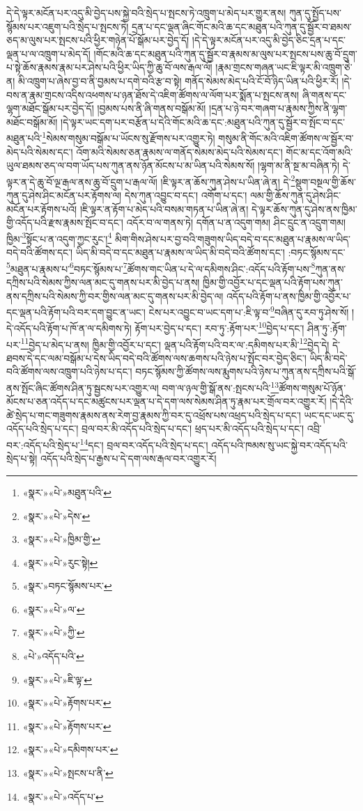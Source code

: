དེ་དེ་ལྟར་མངོན་པར་འདུ་མི་བྱེད་པས་སྐྱེ་བའི་སྲེད་པ་སྤངས་ཏེ་འཁྲུག་པ་མེད་པར་གྱུར་ནས། ཀུན་དུ་སྤྱོད་པས་སྙོམས་པར་འཇུག་པའི་སྲེད་པ་སྤངས་ཏེ། དྲན་པ་དང་ལྡན་ཞིང་གོང་མའི་ཆ་དང་མཐུན་པའི་ཀུན་དུ་སྦྱོར་བ་ཐམས་ཅད་མ་ལུས་པར་སྤངས་པའི་ཕྱིར་གཉེན་པོ་སྒོམ་པར་བྱེད་དོ། །དེ་དེ་ལྟར་མངོན་པར་འདུ་མི་བྱེད་ཅིང་དྲན་པ་དང་ལྡན་པ་ལ་འཁྲུག་པ་མེད་དོ། །གོང་མའི་ཆ་དང་མཐུན་པའི་ཀུན་དུ་སྦྱོར་བ་རྣམས་མ་ལུས་པར་སྤངས་པས་ཆུ་བོ་དྲུག་པ་སྟེ་ཆོས་རྣམས་རྣམ་པར་ཤེས་པའི་ཕྱིར་ཡིད་ཀྱི་ཆུ་བོ་ལས་རྒལ་ལོ། །རྣམ་གྲངས་གཞན་ཡང་ཇི་ལྟར་མི་འཁྲུག་ཅེ་ན། མི་འཁྲུག་པ་ཞེས་བྱ་བ་ནི་བྱམས་པ་དགེ་བའི་རྩ་བ་སྟེ། གནོད་སེམས་མེད་པའི་ངོ་བོ་ཉིད་ཡིན་པའི་ཕྱིར་རོ། །དེ་བས་ན་རྣམ་གྲངས་འདིས་འཕགས་པ་ཉན་ཐོས་དེ་འཇིག་ཚོགས་ལ་ལོག་པར་སྨོན་པ་སྤངས་ནས། ཞི་གནས་དང་ལྷག་མཐོང་སྒོམ་པར་བྱེད་དོ། །བྱམས་པས་ནི་ཞི་གནས་བསྒོམ་མོ། །དྲན་པ་ཉེ་བར་གཞག་པ་རྣམས་ཀྱིས་ནི་ལྷག་མཐོང་བསྒོམ་མོ། །དེ་ལྟར་ཡང་དག་པར་བརྩོན་པ་དེའི་གོང་མའི་ཆ་དང་:མཐུན་པའི་ཀུན་དུ་སྦྱོར་བ་སྤོང་བ་དང་མཐུན་པའི་\footnote{«སྣར་»«པེ་»མཐུན་པའི་}སེམས་གསུམ་བསྒོམ་པ་ཡོངས་སུ་རྫོགས་པར་འགྱུར་ཏེ། གསུམ་ནི་གོང་མའི་འཇིག་ཚོགས་ལ་སྦྱོར་བ་མེད་པའི་སེམས་དང་། འོག་མའི་སེམས་ཅན་རྣམས་ལ་གནོད་སེམས་མེད་པའི་སེམས་དང་། གོང་མ་དང་འོག་མའི་ཡུལ་ཐམས་ཅད་ལ་བག་ཡོད་པས་ཀུན་ནས་ཉོན་མོངས་པ་མ་ཡིན་པའི་སེམས་སོ། །ལྷག་མ་ནི་སྔ་མ་བཞིན་ཏེ། དེ་ལྟར་ན་དེ་ཆུ་བོ་ལྔ་རྒལ་ནས་ཆུ་བོ་དྲུག་པ་རྒལ་ལོ། །ཇི་ལྟར་ན་ཆོས་ཀུན་ཤེས་པ་ཡིན་ཞེ་ན། དེ་\footnote{«སྣར་»«པེ་»དེས་}སྡུག་བསྔལ་གྱི་ཆོས་ཀུན་དུ་ཤེས་ཤིང་མངོན་པར་རྟོགས་ལ། དེས་ཀུན་འབྱུང་བ་དང་། འགོག་པ་དང་། ལམ་གྱི་ཆོས་ཀུན་དུ་ཤེས་ཤིང་མངོན་པར་རྟོགས་པའོ། །ཇི་ལྟར་ན་རྟོག་པ་མེད་པའི་བསམ་གཏན་པ་ཡིན་ཞེ་ན། དེ་ལྟར་ཆོས་ཀུན་དུ་ཤེས་ནས་ཁྱིམ་གྱི་འདོད་པའི་རྫས་རྣམས་སྤོང་བ་དང་། འདོར་བ་ལ་གནས་ཏེ། དགོན་པ་ན་འདུག་གམ། ཤིང་དྲུང་ན་འདྲུག་གམ། ཁྱིམ་\footnote{«སྣར་»«པེ་»ཁྱིམ་གྱི་}སྟོང་པ་ན་འདུག་ཀྱང་རུང་།\footnote{«སྣར་»«པེ་»རུང་སྟེ།} མིག་གིས་ཤེས་པར་བྱ་བའི་གཟུགས་ཡིད་བདེ་བ་དང་མཐུན་པ་རྣམས་ལ་ཡིད་བདེ་བའི་ཚོགས་དང་། ཡིད་མི་བདེ་བ་དང་མཐུན་པ་རྣམས་ལ་ཡིད་མི་བདེ་བའི་ཚོགས་དང་། :བཏང་སྙོམས་དང་\footnote{«སྣར་»བཏང་སྙོམས་པར་}མཐུན་པ་རྣམས་པ་\footnote{«སྣར་»«པེ་»ལ་}བཏང་སྙོམས་པ་\footnote{«སྣར་»«པེ་»ཀྱི་}ཚོགས་གང་ཡིན་པ་དེ་ལ་དམིགས་ཤིང་:འདོད་པའི་རྟོག་པས་\footnote{«པེ་»འདོད་པའི་}ཀུན་ནས་དཀྲིས་པའི་སེམས་ཀྱིས་ལན་མང་དུ་གནས་པར་མི་བྱེད་པ་ནས། ཁྱིམ་གྱི་འབྱོར་པ་དང་ལྡན་པའི་རྟོག་པས་ཀུན་ནས་དཀྲིས་པའི་སེམས་ཀྱི་བར་གྱིས་ལན་མང་དུ་གནས་པར་མི་བྱེད་ལ། འདོད་པའི་རྟོག་པ་ནས་ཁྱིམ་གྱི་འབྱོར་པ་དང་ལྡན་པའི་རྟོག་པའི་བར་དག་བྱུང་ན་ཡང་། ངེས་པར་འབྱུང་བ་ཡང་དག་པ་:ཇི་ལྟ་བ་\footnote{«སྣར་»«པེ་»ཇི་ལྟ་}བཞིན་དུ་རབ་ཏུ་ཤེས་སོ། །དེ་འདོད་པའི་རྟོག་པ་ཁོ་ན་ལ་དམིགས་ཏེ། རྟོག་པར་བྱེད་པ་དང་། རབ་ཏུ་:རྟོག་པར་\footnote{«སྣར་»«པེ་»རྟོགས་པར་}བྱེད་པ་དང་། ཤིན་ཏུ་:རྟོག་པར་\footnote{«སྣར་»«པེ་»རྟོགས་པར་}བྱེད་པ་མེད་པ་ནས། ཁྱིམ་གྱི་འབྱོར་པ་དང་། ལྡན་པའི་རྟོག་པའི་བར་ལ་:དམིགས་པར་མི་\footnote{«སྣར་»«པེ་»དམིགས་པར་}བྱེད་དེ། དེ་ཐབས་དེ་དང་ལམ་བསྒོམ་པ་དེས་ཡིད་བདེ་བའི་ཚོགས་ལས་ཆགས་པའི་ཉེས་པ་སྤོང་བར་བྱེད་ཅིང་། ཡིད་མི་བདེ་བའི་ཚོགས་ལས་འཁྲུག་པའི་ཉེས་པ་དང་། བཏང་སྙོམས་ཀྱི་ཚོགས་ལས་རྨུགས་པའི་ཉེས་པ་ཀུན་ནས་དཀྲིས་པའི་སྒོ་ནས་སྤོང་ཞིང་ཚོགས་ཤིན་ཏུ་སྦྱངས་པར་འགྱུར་ལ། བག་ལ་ཉལ་གྱི་སྒོ་ནས་:སྤངས་པའི་\footnote{«སྣར་»«པེ་»སྤངས་པ་ནི་}ཚོགས་གསུམ་པོ་ཉོན་མོངས་པ་ཅན་འདོད་པ་དང་མཚུངས་པར་ལྡན་པ་དེ་དག་ལས་སེམས་ཤིན་ཏུ་རྣམ་པར་གྲོལ་བར་འགྱུར་རོ། །དེ་དེའི་ཚེ་སྲེད་པ་གང་གཟུགས་རྣམས་ནས་རེག་བྱ་རྣམས་ཀྱི་བར་དུ་འཕྲོས་པས་འཕྲད་པའི་སྲེད་པ་དང་། ཡང་དང་ཡང་དུ་འདོད་པའི་སྲེད་པ་དང་། བྲལ་བར་མི་འདོད་པའི་སྲེད་པ་དང་། ཕྲད་པར་མི་འདོད་པའི་སྲེད་པ་དང་། འབྲི་བར་:འདོད་པའི་སྲེད་པ་\footnote{«སྣར་»«པེ་»འདོད་པ་}དང་། བྲལ་བར་འདོད་པའི་སྲེད་པ་དང་། འདོད་པའི་ཁམས་སུ་ཡང་སྐྱེ་བར་འདོད་པའི་སྲེད་པ་སྟེ། འདོད་པའི་སྲེད་པ་རྒྱས་པ་དེ་དག་ལས་རྒལ་བར་འགྱུར་རོ། 